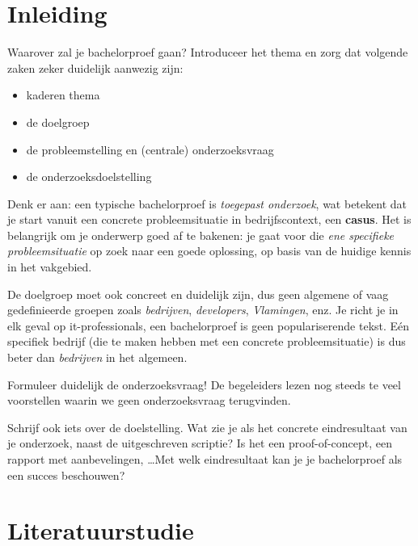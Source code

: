 
\section{Inleiding}%
\label{sec:inleiding}

Waarover zal je bachelorproef gaan? Introduceer het thema en zorg dat volgende zaken zeker duidelijk aanwezig zijn:

\begin{itemize}
  \item kaderen thema
  \item de doelgroep
  \item de probleemstelling en (centrale) onderzoeksvraag
  \item de onderzoeksdoelstelling
\end{itemize}

Denk er aan: een typische bachelorproef is \textit{toegepast onderzoek}, wat betekent dat je start vanuit een concrete probleemsituatie in bedrijfscontext, een \textbf{casus}. Het is belangrijk om je onderwerp goed af te bakenen: je gaat voor die \textit{ene specifieke probleemsituatie} op zoek naar een goede oplossing, op basis van de huidige kennis in het vakgebied.

De doelgroep moet ook concreet en duidelijk zijn, dus geen algemene of vaag gedefinieerde groepen zoals \emph{bedrijven}, \emph{developers}, \emph{Vlamingen}, enz. Je richt je in elk geval op it-professionals, een bachelorproef is geen populariserende tekst. Eén specifiek bedrijf (die te maken hebben met een concrete probleemsituatie) is dus beter dan \emph{bedrijven} in het algemeen.

Formuleer duidelijk de onderzoeksvraag! De begeleiders lezen nog steeds te veel voorstellen waarin we geen onderzoeksvraag terugvinden.

Schrijf ook iets over de doelstelling. Wat zie je als het concrete eindresultaat van je onderzoek, naast de uitgeschreven scriptie? Is het een proof-of-concept, een rapport met aanbevelingen, \ldots Met welk eindresultaat kan je je bachelorproef als een succes beschouwen?


\section{Literatuurstudie}%
\label{sec:literatuurstudie}

